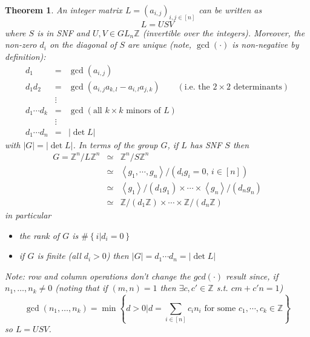 \documentclass[11pt,english]{article}
\newtheorem{theorem}{Theorem}
\begin{document}
\begin{theorem}

An integer matrix $L=\left(a_{i,j}\right)_{i,j\in\left[n\right]}$
can be written as\[
L=USV\]
where $S$ is in SNF and $U,V\in GL_{n}\mathbb{Z}$ (invertible over
the integers). Moreover, the non-zero $d_{i}$ on the diagonal of
$S$ are unique (note, $\gcd\left(\cdot\right)$ is non-negative by
definition):\begin{eqnarray*}
d_{1} & = & \gcd\left(a_{i,j}\right)\\
d_{1}d_{2} & = & \gcd\left(a_{i,j}a_{k,l}-a_{i,l}a_{j,k}\right)\qquad\left(\text{i.e. the }2\times2\text{ determinants}\right)\\
 & \vdots\\
d_{1}\cdots d_{k} & = & \gcd\left(\text{all }k\times k\text{ minors of }L\right)\\
 & \vdots\\
d_{1}\cdots d_{n} & = & \left|\det L\right|\end{eqnarray*}
with $\left|G\right|=\left|\det L\right|$. In terms of the group
$G$, if $L$ has SNF $S$ then \begin{eqnarray*}
G=\mathbb{Z}^{n}/L\mathbb{Z}^{n} & \simeq & \mathbb{Z}^{n}/S\mathbb{Z}^{n}\\
 & \simeq & \left\langle g_{1},\cdots,g_{n}\right\rangle /\left(d_{i}g_{i}=0,\, i\in\left[n\right]\right)\\
 & \simeq & \left\langle g_{1}\right\rangle /\left(d_{1}g_{1}\right)\times\cdots\times\left\langle g_{n}\right\rangle /\left(d_{n}g_{n}\right)\\
 & \simeq & \mathbb{Z}/\left(d_{1}\mathbb{Z}\right)\times\cdots\times\mathbb{Z}/\left(d_{n}\mathbb{Z}\right)\end{eqnarray*}
in particular
\begin{itemize}
\item the rank of $G$ is $\#\left\{ i|d_{i}=0\right\} $
\item if $G$ is finite (all $d_{i}>0$) then $\left|G\right|=d_{1}\cdots d_{n}=\left|\det L\right|$
\end{itemize}
Note: row and column operations don't change the $gcd\left(\cdot\right)$
result since, if $n_{1},\ldots,n_{k}\neq0$ (noting that if $\left(m,n\right)=1$
then $\exists c,c'\in\mathbb{Z}$ s.t. $cm+c'n=1$) \[
\gcd\left(n_{1},\ldots,n_{k}\right)=\min\left\{ \left.d>0\right|d=\sum_{i\in\left[n\right]}c_{i}n_{i}\text{ for some }c_{1},\cdots,c_{k}\in\mathbb{Z}\right\} \]
so $L=USV$.

\end{theorem}
\end{document}
